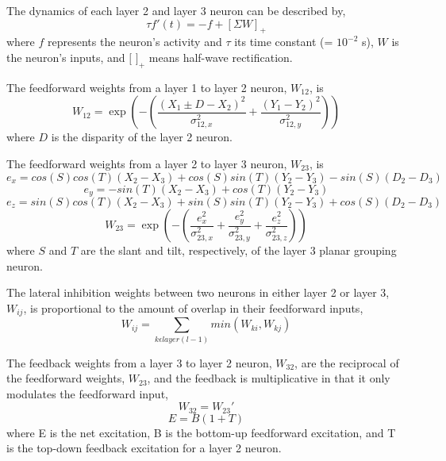 The dynamics of each layer 2 and layer 3 neuron can be described by,
\begin{equation}
\tau f'(t) = -f + [\Sigma W]_+
\end{equation}
where $f$ represents the neuron's activity and $\tau$ its time constant (= $10^{-2}$ s), $W$ is the neuron's inputs, and $[$ $ ]_+$ means half-wave rectification.

The feedforward weights from a layer 1 to layer 2 neuron, $W_{12}$, is
\begin{equation}
W_{12} = \exp(-(\frac{(X_1 \pm D-X_2)^2}{\sigma_{12,x}^2}+\frac{(Y_1-Y_2)^2}{\sigma_{12,y}^2}))
\end{equation}
where $D$ is the disparity of the layer 2 neuron.

The feedforward weights from a layer 2 to layer 3 neuron, $W_{23}$, is
\begin{equation}
e_x= cos(S)cos(T)(X_2-X_3)+cos(S)sin(T)(Y_2-Y_3)-sin(S)(D_2-D_3)
\end{equation}
\begin{equation}
e_y= -sin(T)(X_2-X_3)+cos(T)(Y_2-Y_3)
\end{equation}
\begin{equation}
e_z= sin(S)cos(T)(X_2-X_3)+sin(S)sin(T)(Y_2-Y_3)+cos(S)(D_2-D_3)
\end{equation}
\begin{equation}
W_{23} = \exp(-(\frac{e_x^2}{\sigma_{23,x}^2}+\frac{e_y^2}{\sigma_{23,y}^2}+\frac{e_z^2}{\sigma_{23,z}^2})) 
\end{equation}
where $S$ and $T$ are the slant and tilt, respectively, of the layer 3 planar grouping neuron.

The lateral inhibition weights between two neurons in either layer 2 or layer 3, $W_{ij}$, is proportional to the amount of overlap in their feedforward inputs,
\begin{equation}
W_{ij} = \sum\limits_{k \epsilon layer(l-1)} min(W_{ki}, W_{kj})
\end{equation}

The feedback weights from a layer 3 to layer 2 neuron, $W_{32}$, are the reciprocal of the feedforward weights, $W_{23}$, and the feedback is multiplicative in that it only modulates the feedforward input,
\begin{equation}
W_{32} = W_{23}'
\end{equation}
\begin{equation}
E = B(1 + T)
\end{equation}
where E is the net excitation,  B is the bottom-up feedforward excitation, and T is the top-down feedback excitation for a layer 2 neuron.


